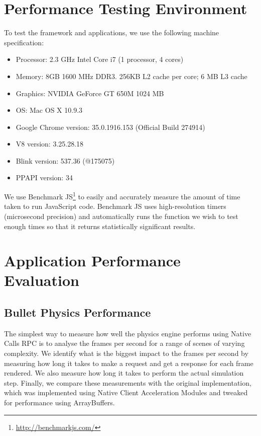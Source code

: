\section{Performance Testing Environment} %
\label{sec:performance_testing_environment}
To test the framework and applications, we use the following machine specification:
\begin{itemize}
  \item Processor: 2.3 GHz Intel Core i7 (1 processor, 4 cores)
  \item Memory: 8GB 1600 MHz DDR3. 256KB L2 cache per core; 6 MB L3 cache
  \item Graphics: NVIDIA GeForce GT 650M 1024 MB
  \item OS: Mac OS X 10.9.3
  \item Google Chrome version: 35.0.1916.153 (Official Build 274914) 
  \item V8 version: 3.25.28.18
  \item Blink version: 537.36 (@175075)
  \item PPAPI version: 34
\end{itemize}

We use Benchmark JS\footnote{\url{http://benchmarkjs.com/}} to easily and accurately measure the amount of time taken to run JavaScript code. Benchmark JS uses high-resolution timers (microsecond precision) and automatically runs the function we wish to test enough times so that it returns statistically significant results. 

\section{Application Performance Evaluation} %
\label{sec:application_performance_evaluation}
\subsection{Bullet Physics Performance} %
\label{sub:bullet_physics_performance}
The simplest way to measure how well the physics engine performs using Native Calls RPC is to analyse the frames per second for a range of scenes of varying complexity. We identify what is the biggest impact to the frames per second by measuring how long it takes to make a request and get a response for each frame rendered. We also measure how long it takes to perform the actual simulation step. Finally, we compare these measurements with the original implementation, which was implemented using Native Client Acceleration Modules and tweaked for performance using ArrayBuffers.


